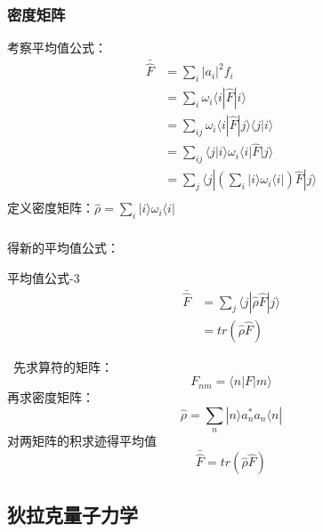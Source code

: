 \begin{frame}
    \frametitle{密度矩阵}
    考察平均值公式：\\
    $$ \begin{aligned}
    \bar{\hat{F}} &=\sum\limits_i |a_i|^2 f_i \\
            &=\sum\limits_i \omega_i \langle i |\hat{F}|i \rangle  \\
            &=\sum\limits_{ij} \omega_i \langle i |\hat{F} |j\rangle \langle j| i\rangle  \\
            &=\sum\limits_{ij} \langle j| i\rangle  \omega_i \langle i |\hat{F} |j\rangle  \\
            &=\sum\limits_{j} \langle j | (\sum\limits_{i}| i \rangle  \omega_i \langle i |) \hat{F} |j\rangle  \\
    \end{aligned} $$
    定义密度矩阵：$ \hat{\rho} = \sum\limits_{i}| i \rangle  \omega_i \langle i | $
\end{frame} 
 
\begin{frame}  
    \frametitle{}  得新的平均值公式：
    \begin{tcolorbox1}{平均值公式-3}
         $$ \begin{aligned}
            \bar{\hat{F}}&=\sum\limits_{j} \langle j | \hat{\rho} \hat{F} |j\rangle \\
                &=tr (\hat{\rho} \hat{F} )
        \end{aligned} $$   
    \end{tcolorbox1} 
\end{frame} 
 
\begin{frame}      
    \例[1.求算符$\hat{F}$在 $|\Psi\rangle =\sum\limits_n a_n |n\rangle $上的平均值]{}
    \解~先求算符的矩阵：
    $$ F_{nm} = \langle n | F |m \rangle  $$
    再求密度矩阵：
    $$ \hat{\rho} = \sum\limits_{n}| n \rangle  a_n ^* a_n \langle n | $$
    对两矩阵的积求迹得平均值
    $$\bar{\hat{F}}=tr (\hat{\rho} \hat{F} )$$
\end{frame} 
 
\subsection{狄拉克量子力学}

